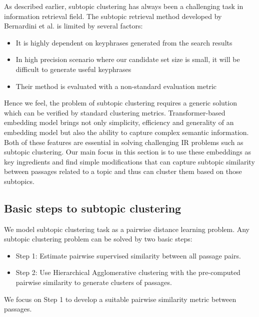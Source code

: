 As described earlier, subtopic clustering has always been a challenging task in information retrieval field. The subtopic retrieval method developed by Bernardini et al. is limited by several factors: 
\begin{itemize}[leftmargin=.15in]
    \item It is highly dependent on keyphrases generated from the search results
    \item In high precision scenario where our candidate set size is small, it will be difficult to generate useful keyphrases
    \item Their method is evaluated with a non-standard evaluation metric
\end{itemize}
Hence we feel, the problem of subtopic clustering requires a generic solution which can be verified by standard clustering metrics. Transformer-based embedding model brings not only simplicity, efficiency and generality of an embedding model but also the ability to capture complex semantic information. Both of these features are essential in solving challenging IR problems such as subtopic clustering. Our main focus in this section is to use these embeddings as key ingredients and find simple modifications that can capture subtopic similarity between passages related to a topic and thus can cluster them based on those subtopics.

\subsection{Basic steps to subtopic clustering} We model subtopic clustering task as a pairwise distance learning problem. Any subtopic clustering problem can be solved by two basic steps:
\begin{itemize}[leftmargin=.15in]
    \item Step 1: Estimate pairwise supervised similarity between all passage pairs.
    \item Step 2: Use Hierarchical Agglomerative clustering with the pre-computed pairwise similarity to generate clusters of passages.
\end{itemize}

We focus on Step 1 to develop a suitable pairwise similarity metric between passages.

